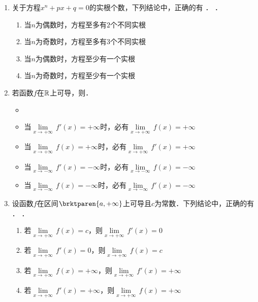 \begin{enumerate}
\item 关于方程\(x^n + px + q = 0\)的实根个数，下列结论中，正确的有\ifshowsol
    \uline{}．
  \else
    \uline{\hspace{6em}}．
  \fi
  \begin{enumerate}
    \renewcommand{\labelenumii}{\enumparen{\arabic{enumii}}}
  \item 当\(n\)为偶数时，方程至多有\(2\)个不同实根
  \item 当\(n\)为奇数时，方程至多有\(3\)个不同实根
  \item 当\(n\)为偶数时，方程至少有一个实根
  \item 当\(n\)为奇数时，方程至少有一个实根
  \end{enumerate}

\item 若函数\(f\)在\(\mathbb{R}\)上可导，则\uline{\hspace{10em}}．
  \begin{itemize}
    \renewcommand{\labelitemi}{\faCircleThin}
    \ifshowsol
    \item[\faCircle]
    \else
    \item
    \fi
    当\(\!\lim\limits_{x\to+\infty}\,f'(x) = +\infty\)时，必有\(\!\lim\limits_{x\to+\infty}\,f(x) = +\infty\)
  \item 当\(\!\lim\limits_{x\to+\infty}\,f(x) = +\infty\)时，必有\(\!\lim\limits_{x\to+\infty}\,f'(x) = +\infty\)
  \item 当\(\!\lim\limits_{x\to-\infty}\,f'(x) = -\infty\)时，必有\(\!\lim\limits_{x\to-\infty}\,f(x) = -\infty\)
  \item 当\(\!\lim\limits_{x\to-\infty}\,f(x) = -\infty\)时，必有\(\!\lim\limits_{x\to-\infty}\,f'(x) = -\infty\)
  \end{itemize}

\item 设函数\(f\)在区间\(\brktparen{a,+\infty}\)上可导且\(c\)为常数．下列结论中，正确的有\ifshowsol
    \uline{}．
  \else
    \uline{\hspace{6em}}．
  \fi
  \begin{enumerate}
    \renewcommand{\labelenumii}{\enumparen{\arabic{enumii}}}
  \item 若\(\!\lim\limits_{x\to+\infty}\,f(x) = c\)，则\(\!\lim\limits_{x\to+\infty}\,f'(x) = 0\)
  \item 若\(\!\lim\limits_{x\to+\infty}\,f'(x) = 0\)，则\(\!\lim\limits_{x\to+\infty}\,f(x) = c\)
  \item 若\(\!\lim\limits_{x\to+\infty}\,f(x) = +\infty\)，则\(\!\lim\limits_{x\to+\infty}\,f'(x) = +\infty\)
  \item 若\(\!\lim\limits_{x\to+\infty}\,f'(x) = +\infty\)，则\(\!\lim\limits_{x\to+\infty}\,f(x) = +\infty\)
  \end{enumerate}


\end{enumerate}
